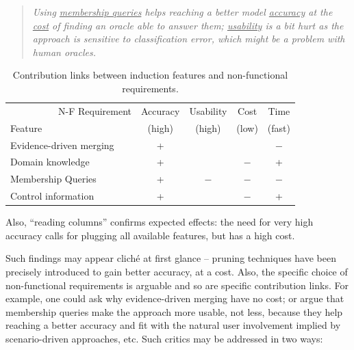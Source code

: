 \begin{quote}\emph{Using \underline{membership queries} helps reaching a better model \underline{accuracy} at the \underline{cost} of finding an oracle able to answer them; \underline{usability} is a bit hurt as the approach is sensitive to classification error, which might be a problem with human oracles.}\end{quote}

\begin{table}[h]
\small
\renewcommand{\arraystretch}{1.3}
\begin{center}
\begin{tabular}{| l || c | c | c | c |}
\hline
~~~~~~~~~~N-F Requirement & Accuracy &   Usability    &    Cost    &  Time   \\
Feature                   &  (high)  &     (high)     &    (low)   & (fast)  \\
\hline
\hline
Evidence-driven merging   &    +     &                &            &   $-$   \\
Domain knowledge          &    +     &                &     $-$    &   +     \\
Membership Queries        &    +     &      $-$       &     $-$    &   $-$   \\
Control information       &    +     &                &     $-$    &   +     \\
\hline
\end{tabular}
\end{center}
\caption{Contribution links between induction features and non-functional requirements.\label{table:evaluation-contribution-links}}
\end{table}

Also, ``reading columns'' confirms expected effects: the need for very high accuracy calls for plugging all available features, but has a high cost. 

Such findings may appear clich\'e at first glance -- pruning techniques have been precisely introduced to gain better accuracy, at a cost. Also, the specific choice of non-functional requirements is arguable and so are specific contribution links. For example, one could ask why evidence-driven merging have no cost; or argue that membership queries make the approach more usable, not less, because they help reaching a better accuracy and fit with the natural user involvement implied by scenario-driven approaches, etc. Such critics may be addressed in two ways:


